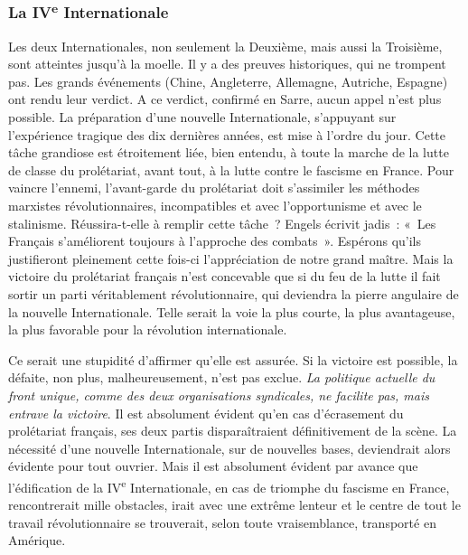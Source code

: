 \documentclass[french,twoside]{book} %
\begin{document}
 \subsubsection[{La IVe Internationale}]{La IV\textsuperscript{e} Internationale}
\noindent Les deux Internationales, non seulement la Deuxième, mais aussi la Troisième, sont atteintes jusqu’à la moelle. Il y a des preuves historiques, qui ne trompent pas. Les grands événements (Chine, Angleterre, Allemagne, Autriche, Espagne) ont rendu leur verdict. A ce verdict, confirmé en Sarre, aucun appel n’est plus possible. La préparation d’une nouvelle Internationale, s’appuyant sur l’expérience tragique des dix dernières années, est mise à l’ordre du jour. Cette tâche grandiose est étroitement liée, bien entendu, à toute la marche de la lutte de classe du prolétariat, avant tout, à la lutte contre le fascisme en France. Pour vaincre l’ennemi, l’avant-garde du prolétariat doit s’assimiler les méthodes marxistes révolutionnaires, incompatibles et avec l’opportunisme et avec le stalinisme. Réussira-t-elle à remplir cette tâche ? Engels écrivit jadis : « Les Français s’améliorent toujours à l’approche des combats ». Espérons qu’ils justifieront pleinement cette fois-ci l’appréciation de notre grand maître. Mais la victoire du prolétariat français n’est concevable que si du feu de la lutte il fait sortir un parti véritablement révolutionnaire, qui deviendra la pierre angulaire de la nouvelle Internationale. Telle serait la voie la plus courte, la plus avantageuse, la plus favorable pour la révolution internationale.\par
Ce serait une stupidité d’affirmer qu’elle est assurée. Si la victoire est possible, la défaite, non plus, malheureusement, n’est pas exclue. \emph{La politique actuelle du front unique, comme des deux organisations syndicales, ne facilite pas, mais entrave la victoire}. Il est absolument évident qu’en cas d’écrasement du prolétariat français, ses deux partis disparaîtraient définitivement de la scène. La nécessité d’une nouvelle Internationale, sur de nouvelles bases, deviendrait alors évidente pour tout ouvrier. Mais il est  absolument évident par avance que l’édification de la IV\textsuperscript{e} Internationale, en cas de triomphe du fascisme en France, rencontrerait mille obstacles, irait avec une extrême lenteur et le centre de tout le travail révolutionnaire se trouverait, selon toute vraisemblance, transporté en Amérique.\par
\end{document}
